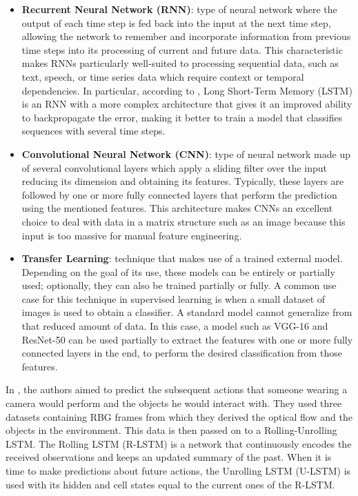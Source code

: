 \documentclass[conference]{IEEEtran}
\begin{document}
\begin{itemize}
\item \textbf{Recurrent Neural Network (RNN)}: type of neural network where the output of each time step is fed back into the input at the next time step, allowing the network to remember and incorporate information from previous time steps into its processing of current and future data. This characteristic makes RNNs particularly well-suited to processing sequential data, such as text, speech, or time series data which require context or temporal dependencies. In particular, according to \cite{lstm_advantages}, Long Short-Term Memory (LSTM) is an RNN with a more complex architecture that gives it an improved ability to backpropagate the error, making it better to train a model that classifies sequences with several time steps.

\item \textbf{Convolutional Neural Network (CNN)}: type of neural network made up of several convolutional layers which apply a sliding filter over the input reducing its dimension and obtaining its features. Typically, these layers are followed by one or more fully connected layers that perform the prediction using the mentioned features. This architecture makes CNNs an excellent choice to deal with data in a matrix structure such as an image because this input is too massive for manual feature engineering.

\item \textbf{Transfer Learning}: technique that makes use of a trained external model. Depending on the goal of its use, these models can be entirely or partially used; optionally, they can also be trained partially or fully. A common use case for this technique in supervised learning is when a small dataset of images is used to obtain a classifier. A standard model cannot generalize from that reduced amount of data. In this case, a model such as VGG-16 and ResNet-50 can be used partially to extract the features with one or more fully connected layers in the end, to perform the desired classification from those features.
\end{itemize}

In \textcite{Furnari2021}, the authors aimed to predict the subsequent actions that someone wearing a camera would perform and the objects he would interact with. They used three datasets containing RBG frames from which they derived the optical flow and the objects in the environment. This data is then passed on to a Rolling-Unrolling LSTM. The Rolling LSTM (R-LSTM) is a network that continuously encodes the received observations and keeps an updated summary of the past. When it is time to make predictions about future actions, the Unrolling LSTM (U-LSTM) is used with its hidden and cell states equal to the current ones of the R-LSTM.
\end{document}
